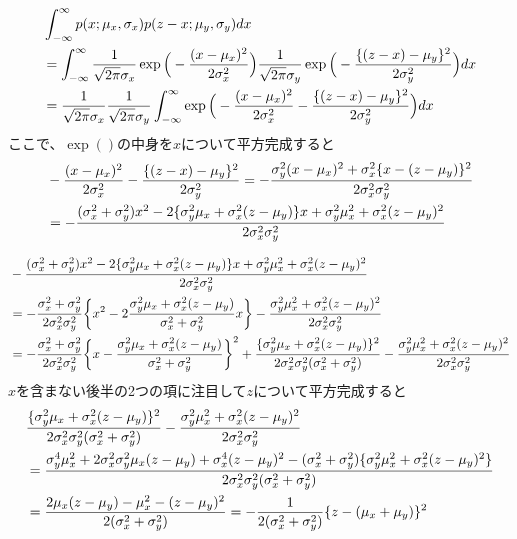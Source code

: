 \documentclass[aspectratio=169,unicode,dvipdfmx,14pt]{beamer}
\begin{document}
\begin{frame}
\FontMath
\begin{align}
& \int_{-\infty}^{\infty}
p(x;\mu_x,\sigma_x)p(z-x;\mu_y,\sigma_y)dx
\notag \\
& = \int_{-\infty}^{\infty}
\frac{1}{\sqrt{2\pi}\sigma_x}\exp\Big(-\frac{(x-\mu_x)^2}{2\sigma_x^2}\Big)
\frac{1}{\sqrt{2\pi}\sigma_y}\exp\Big(-\frac{\{(z-x)-\mu_y\}^2}{2\sigma_y^2}\Big)dx
\notag \\
& = 
\frac{1}{\sqrt{2\pi}\sigma_x}
\frac{1}{\sqrt{2\pi}\sigma_y}
\int_{-\infty}^{\infty}
\exp\Big(-\frac{(x-\mu_x)^2}{2\sigma_x^2}
-\frac{\{(z-x)-\mu_y\}^2}{2\sigma_y^2}\Big)dx
\end{align}
ここで、$\exp()$の中身を$x$について平方完成すると
\begin{align}
& -\frac{(x-\mu_x)^2}{2\sigma_x^2}
-\frac{\{(z-x)-\mu_y\}^2}{2\sigma_y^2}
=
-\frac{\sigma_y^2(x-\mu_x)^2 + \sigma_x^2\{x-(z-\mu_y)\}^2}{2\sigma_x^2\sigma_y^2}
\notag \\ & =
-\frac{(\sigma_x^2+\sigma_y^2)x^2-2\{\sigma_y^2\mu_x+\sigma_x^2(z-\mu_y)\}x
+\sigma_y^2\mu_x^2+\sigma_x^2(z-\mu_y)^2}
{2\sigma_x^2\sigma_y^2}
\end{align}
\end{frame}

\begin{frame}
\FontMath
\begin{align}
& -\frac{(\sigma_x^2+\sigma_y^2)x^2-2\{\sigma_y^2\mu_x+\sigma_x^2(z-\mu_y)\}x
+\sigma_y^2\mu_x^2+\sigma_x^2(z-\mu_y)^2}
{2\sigma_x^2\sigma_y^2}
\notag \\ & =
-\frac{\sigma_x^2+\sigma_y^2}{2\sigma_x^2\sigma_y^2}\bigg\{
x^2
-2\frac{\sigma_y^2\mu_x+\sigma_x^2(z-\mu_y)}{\sigma_x^2+\sigma_y^2}x\bigg\}
-\frac{\sigma_y^2\mu_x^2+\sigma_x^2(z-\mu_y)^2}{2\sigma_x^2\sigma_y^2}
\notag \\ & =
-\frac{\sigma_x^2+\sigma_y^2}{2\sigma_x^2\sigma_y^2}\bigg\{
x - \frac{\sigma_y^2\mu_x+\sigma_x^2(z-\mu_y)}{\sigma_x^2+\sigma_y^2}\bigg\}^2
+ \frac{ \{ \sigma_y^2\mu_x+\sigma_x^2(z-\mu_y) \}^2 }{2\sigma_x^2\sigma_y^2(\sigma_x^2+\sigma_y^2)}
-\frac{\sigma_y^2\mu_x^2+\sigma_x^2(z-\mu_y)^2}{2\sigma_x^2\sigma_y^2}
\end{align}
$x$を含まない後半の2つの項に注目して$z$について平方完成すると
\begin{align}
&\frac{ \{ \sigma_y^2\mu_x+\sigma_x^2(z-\mu_y) \}^2 }{2\sigma_x^2\sigma_y^2(\sigma_x^2+\sigma_y^2)}
-\frac{\sigma_y^2\mu_x^2+\sigma_x^2(z-\mu_y)^2}{2\sigma_x^2\sigma_y^2}
\notag \\ & =
\frac{ \sigma_y^4\mu_x^2 + 2 \sigma_x^2\sigma_y^2\mu_x(z-\mu_y) + \sigma_x^4(z-\mu_y)^2
- (\sigma_x^2+\sigma_y^2) \{ \sigma_y^2\mu_x^2+\sigma_x^2(z-\mu_y)^2 \} }
{2\sigma_x^2\sigma_y^2(\sigma_x^2+\sigma_y^2)}
\notag \\ & =
\frac{ 2\mu_x(z-\mu_y) - \mu_x^2 - (z-\mu_y)^2 }{2(\sigma_x^2+\sigma_y^2)}
= -\frac{1}{2(\sigma_x^2+\sigma_y^2)} \{ z - (\mu_x + \mu_y) \}^2
\end{align}
\end{frame}
\end{document}
